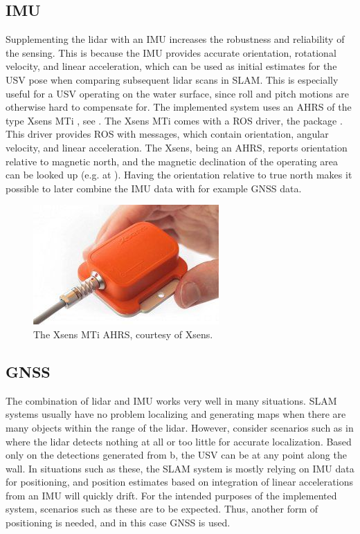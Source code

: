 \subsection{IMU}

Supplementing the lidar with an IMU increases the robustness and reliability of the sensing. This is because the IMU provides accurate orientation, rotational velocity, and linear acceleration, which can be used as initial estimates for the USV pose when comparing subsequent lidar scans in SLAM. This is especially useful for a USV operating on the water surface, since roll and pitch motions are otherwise hard to compensate for. The implemented system uses an AHRS of the type Xsens MTi \citep{website:xsens}, see . The Xsens MTi comes with a ROS driver, the  package \citep{website:xsensDriver}. This driver provides ROS with  messages, which contain orientation, angular velocity, and linear acceleration. The Xsens, being an AHRS, reports orientation relative to magnetic north, and the magnetic declination of the operating area can be looked up (e.g. at \citet{website:magcalc}). Having the orientation relative to true north makes it possible to later combine the IMU data with for example GNSS data.


\begin{figure}[h!]
	\centering
	\includegraphics[width=0.5\linewidth]{fig/instrumentation/xsens_mti2}
	\caption[The Xsens MTi.]{The Xsens MTi AHRS, courtesy of Xsens.}
	\label{fig:xsens}
\end{figure}

\subsection{GNSS}

The combination of lidar and IMU works very well in many situations. SLAM systems usually have no problem localizing and generating maps when there are many objects within the range of the lidar. However, consider scenarios such as in  where the lidar detects nothing at all or too little for accurate localization. Based only on the detections generated from b, the USV can be at any point along the wall. In situations such as these, the SLAM system is mostly relying on IMU data for positioning, and position estimates based on integration of linear accelerations from an IMU will quickly drift. For the intended purposes of the implemented system, scenarios such as these are to be expected. Thus, another form of positioning is needed, and in this case GNSS is used.

